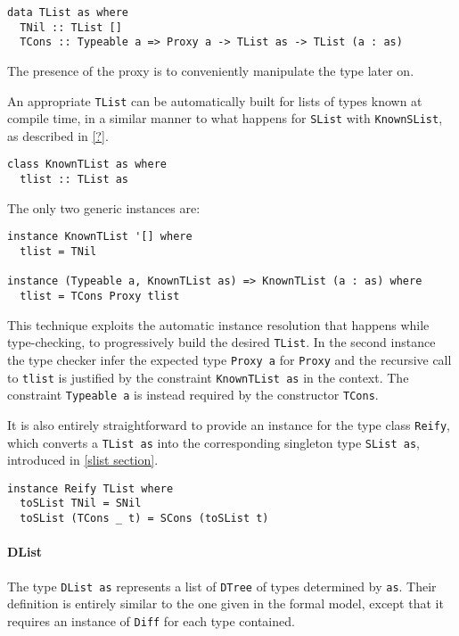 \documentclass[../Thesis.tex]{subfiles}
\begin{document}
\begin{verbatim}
data TList as where
  TNil :: TList []
  TCons :: Typeable a => Proxy a -> TList as -> TList (a : as)
\end{verbatim}
	The presence of the proxy is to conveniently manipulate the type later on.
	
	An appropriate \texttt{TList} can be automatically built for lists of types 
	known at compile time, in a similar manner to what happens for
	\texttt{SList} with \texttt{KnownSList}, as described in \ref{?}.
	
\begin{verbatim}
class KnownTList as where
  tlist :: TList as
\end{verbatim}
	The only two generic instances are:
\begin{verbatim}
instance KnownTList '[] where
  tlist = TNil

instance (Typeable a, KnownTList as) => KnownTList (a : as) where
  tlist = TCons Proxy tlist
\end{verbatim}

	This technique exploits the automatic instance resolution that happens
	while type-checking, to progressively build the desired \texttt{TList}.
	In the second instance the type checker infer the expected type 
	\texttt{Proxy a} for \texttt{Proxy} and the recursive call to \texttt{tlist} is 
	justified by the constraint  \texttt{KnownTList as} in the context. 
	The constraint \texttt{Typeable a} is instead required by
	the constructor \texttt{TCons}.
		
	It is also entirely straightforward to provide an instance for the 
	type	class \texttt{Reify}, which converts a \texttt{TList as} 
	into the corresponding singleton type 
	\texttt{SList as}, introduced in \ref{slist section}. 

\begin{verbatim}
instance Reify TList where
  toSList TNil = SNil
  toSList (TCons _ t) = SCons (toSList t)
\end{verbatim}
	
	\paragraph{DList}
	The type \texttt{DList as} represents a list of \texttt{DTree} of types
	determined by 	\texttt{as}. Their definition is entirely similar to
	the one given in the formal model, except that it requires
	an instance of \texttt{Diff} for each type contained.
	
\end{document}
